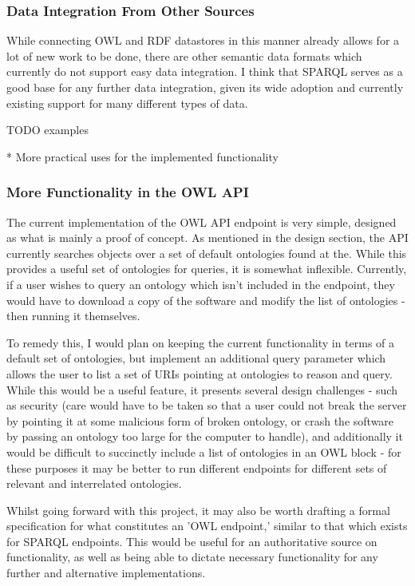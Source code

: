 \documentclass{article}
\begin{document}
\subsubsection{Data Integration From Other Sources}

While connecting OWL and RDF datastores in this manner already allows for a lot
of new work to be done, there are other semantic data
formats which currently do not support easy data integration. I think that SPARQL 
serves as a good base for any further data integration,
given its wide adoption and currently existing support for many different types
of data.

TODO examples

* More practical uses for the implemented functionality

\subsubsection{More Functionality in the OWL API}

The current implementation of the OWL API endpoint is very simple, designed as
what is mainly a proof of concept. As mentioned in the design
section, the API currently searches objects over a set of default ontologies
found at the\cite{obofoundry}. While this provides a useful set of
ontologies for queries, it is somewhat inflexible. Currently, if a user wishes
to query an ontology which isn't included in the endpoint, they
would have to download a copy of the software and modify the list of ontologies
- then running it themselves.

To remedy this, I would plan on keeping the current functionality in terms of a
default set of ontologies, but implement an additional query
parameter which allows the user to list a set of URIs pointing at ontologies to
reason and query. While this would be a useful feature, it
presents several design challenges - such as security (care would have to be
taken so that a user could not break the server by pointing it
at some malicious form of broken ontology, or crash the software by passing an
ontology too large for the computer to handle), and additionally
it would be difficult to succinctly include a list of ontologies in an OWL block
- for these purposes it may be better to run different endpoints
for different sets of relevant and interrelated ontologies.

Whilst going forward with this project, it may also be worth drafting a formal
specification for what constitutes an 'OWL endpoint,' similar
to that which exists for SPARQL endpoints. This would be useful for an
authoritative source on functionality, as well as being able
to dictate necessary functionality for any further and alternative
implementations.
\end{document}
